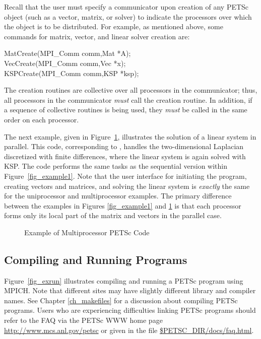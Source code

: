 Recall that the user must specify a communicator upon creation of any
PETSc object (such as a vector, matrix, or solver) to indicate the
processors over which the object is to be distributed.  For example,
as mentioned above, some commands for matrix, vector, and linear solver
creation are:
\begin{tabbing}
  MatCreate(MPI\_Comm comm,Mat *A);\\
  VecCreate(MPI\_Comm comm,Vec *x);\\
  KSPCreate(MPI\_Comm comm,KSP *ksp);
\end{tabbing}
The creation routines are collective over all processors in the
communicator; thus, all processors in the communicator {\em must}
call the creation routine.  In addition, if a sequence of
collective routines is being used, they {\em must} be called
in the same order on each processor.

The next example, given in Figure~\ref{fig_example2}, illustrates the
solution of a linear system in parallel.  This code, corresponding to
, handles the
two-dimensional Laplacian discretized with finite differences, where
the linear system is again solved with KSP.  The code performs the
same tasks as the sequential version within Figure~\ref{fig_example1}.
Note that the user interface for initiating the program, creating
vectors and matrices, and solving the linear system is {\em exactly}
the same for the uniprocessor and multiprocessor examples.  The
primary difference between the examples in Figures \ref{fig_example1}
and \ref{fig_example2} is that each processor forms only its local
part of the matrix and vectors in the parallel case.

\begin{figure}[H]
{\footnotesize
{}
}
\nobreak
\caption{Example of Multiprocessor PETSc Code}
\label{fig_example2}
\end{figure}

\subsection*{Compiling and Running Programs}

Figure~\ref{fig_exrun} illustrates compiling and running a PETSc program
using MPICH.  Note that different sites may have slightly different
library and compiler names.  See Chapter \ref{ch_makefiles}
for a discussion about compiling PETSc programs.
Users who are experiencing difficulties linking PETSc programs should
refer to the FAQ  via the PETSc WWW home page
\href{http://www.mcs.anl.gov/petsc}{http://www.mcs.anl.gov/petsc} or
given in the file \href{faq.html}{\${PETSC\_DIR}/docs/faq.html}.

